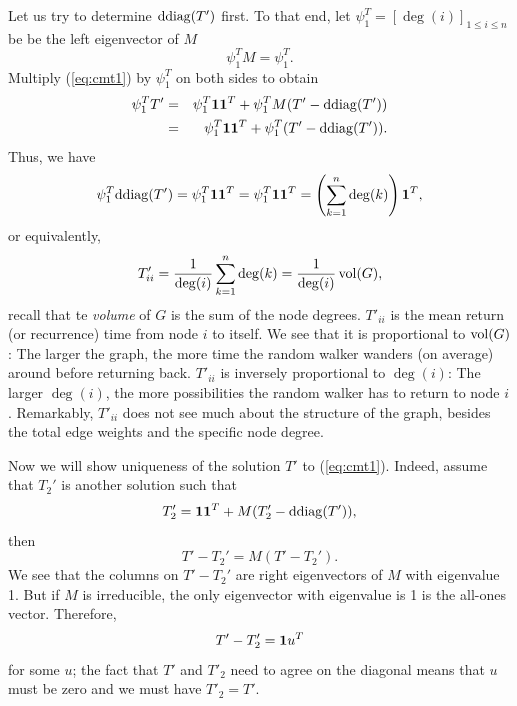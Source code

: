 Let us try to determine $\mathrm{ddiag}(T')$ first. To that end,
let ${\psi}_{1}^T=[\deg(i)]_{1\leq i\leq n}$ be
be the left eigenvector of $M$
\begin{equation}
{\psi}_{1}^{T}M={\psi}_{1}^{T}.
\end{equation}
Multiply (\ref{eq:cmt1}) by ${\psi}_{1}^{T}$ on both sides to obtain
\begin{eqnarray}
{\psi}_{1}^{T}T' & = & {\psi}_{1}^{T}\mathbf{1}\mathbf{1}^T+{\psi}_{1}^{T}M(T'-\mathrm{ddiag}(T'))\\
 & = & {\psi}_{1}^{T}\mathbf{1}\mathbf{1}^T+{\psi}_{1}^{T}(T'-\mathrm{ddiag}(T')).\nonumber
\end{eqnarray}
Thus, we have
\begin{equation}
{\psi}_{1}^{T}\mathrm{ddiag}(T')={\psi}_{1}^{T}\mathbf{1}\mathbf{1}^T={\psi}_{1}^{T}\mathbf{1}\mathbf{1}^T=\left(\sum_{k=1}^{n}\deg(k)\right)\mathbf{1}^T,
\label{eq:cmt2}
\end{equation}
or equivalently,
\begin{equation}
T'_{ii}=\frac{1}{\deg(i)}\sum_{k=1}^{n}\deg(k) = \frac{1}{\deg(i)} \operatorname{vol}(G),
\end{equation}
recall that te {\em volume} of $G$ is the sum of the node degrees. %
$T'_{ii}$ is the mean return (or recurrence) time from node $i$ to itself. We see that it is proportional to $\operatorname{vol}(G)$: The larger the graph, the more time the random walker wanders (on average) around before returning back. $T'_{ii}$ is inversely proportional to $\deg(i)$: The larger $\deg(i)$, the more possibilities the random walker has to return to node $i$. Remarkably, $T'_{ii}$ does not see much about the structure of the graph, besides the total edge weights and the specific node degree.

Now we will show uniqueness of the solution $T'$ to (\ref{eq:cmt1}). Indeed,
assume that $T_2'$ is another solution such that
\begin{equation}
T_2'=\mathbf{1}\mathbf{1}^T+M(T_2'-\mathrm{ddiag}(T')),
\end{equation}
then
\begin{equation}
T'-T_2'=M(T'-T_2').
\end{equation}
We see that the columns on $T'-T_2'$ are right eigenvectors of $M$ with eigenvalue 1. But if $M$ is irreducible, the only eigenvector with eigenvalue is 1 is the all-ones vector. Therefore,
\begin{equation}
T'-T_2'={\textbf 1}{u}^{T}
\end{equation}
 for some $u$; the fact that $T'$ and $T'_2$ need to agree on the diagonal means that $u$ must be zero and we must have $T'_2=T'$.

